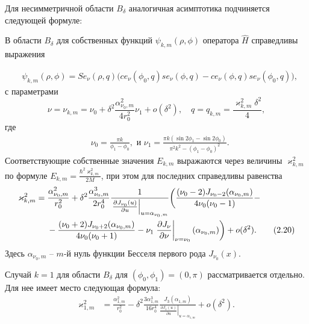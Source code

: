 Для несимметричной области $B_\delta$  аналогичная асимптотика подчиняется следующей формуле:
\renewcommand{\thetheorem}{6}
\begin{theorem}
В области  $B_\delta$ для собственных функций $\psi_{k, m}(\rho, \phi)$ оператора $\hat{H}$ справедливы выражения

\begin{align}
&\psi_{k, m}(\rho, \phi) = 
    Se_\nu(\rho, q) \biggl( ce_\nu(\phi_0, q) se_\nu(\phi, q) -ce_\nu(\phi, q) se_\nu(\phi_0, q) \biggr) ,  \tag{2.19}
\end{align}
с параметрами
\begin{equation*}    
\nu = \nu_{k,m} = \nu_0 +\delta^2 \frac{\alpha_{\nu_0, m}^2}{4 r_0^2} \nu_1 + o(\delta^2), \quad q=q_{k,m} = \frac{\varkappa_{k,m}^2 \delta^2}{4},
\end{equation*}
где
\begin{align*}
& \nu_0 = \frac{\pi k}{\phi_1-\phi_0},\text{\ \ и \ \ }
\nu_1= \frac{\pi k (\sin 2\phi_1 - \sin 2 \phi_0)}{\pi^2k^2-(\phi_1-\phi_0)^2} .
\end{align*}
Соответствующие собственные значения $E_{k, m}$ выражаются через величины $\varkappa^2_{k, m}$ по формуле $E_{k, m} =  \frac{\hbar^2 \varkappa^2_{k, m}}{2M}$, при этом для последних  справедливы равенства
\begin{align}
\varkappa_{k, m}^2 ={}& \frac{\alpha_{\nu_0, m}^2}{r_0^2} +  \delta^2 \frac{\alpha_{\nu_0, m}^3}{2 r_0^4}\frac{1}{ \left.\frac{\partial J_{\nu_0}(u)}{\partial u}\right|_{u=\alpha_{\nu_0, m}} }  
 \biggl(\frac{(\nu_0 - 2)J_{\nu_0-2}(\alpha_{\nu_0, m})   }{4\nu_0 (\nu_0-1)} -
\notag \\ 
&{}- \frac{(\nu_0 + 2)J_{\nu_0+2}(\alpha_{\nu_0, m})}{4\nu_0 (\nu_0+1)} 
- \nu_1 \left.\frac{\partial J_\nu}{\partial \nu}\right|_{\nu = \nu_0}(\alpha_{\nu_0, m})
    \biggr) + o(\delta^2).
    \tag{2.20}
\end{align}
Здесь $\alpha_{\nu_0,m}$ -- $m$-й нуль функции Бесселя первого рода $J_{\nu_0}(x)$.
\end{theorem}

Случай $k=1$ для области $B_\delta$ для $(\phi_0, \phi_1)=(0,\pi)$  рассматривается отдельно. Для нее имеет место следующая формула:
\begin{align}
     \varkappa_{1, m}^2& = \frac{\alpha_{1, m}^2}{r_0^2} - \delta^2 \frac{3\alpha_{1, m}^3}{16r_0^4} 
    \frac{J_3(\alpha_{1, m})}{\left.\frac{\partial J_1 (u)}{\partial u}\right|_{u=\alpha_{1, m}}} 
    + o(\delta^2).  
    \tag{2.21}
\end{align}

